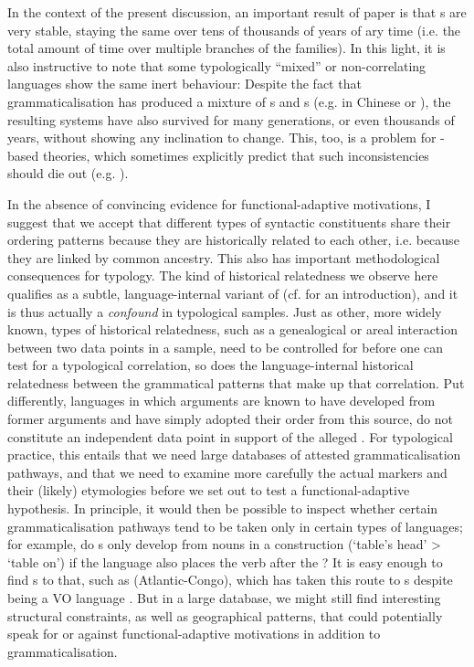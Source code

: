\documentclass[output=paper]{langsci/langscibook}
\begin{document}
  
In the context of the present discussion, an important result of  paper is that s are very stable, staying the same over tens of thousands of years of ary time (i.e. the total amount of time over multiple branches of the families). In this light, it is also instructive to note that some typologically “mixed” or non-correlating languages show the same inert behaviour: Despite the fact that grammaticalisation has produced a mixture of s and s (e.g. in Chinese or ), the resulting systems have also survived for many generations, or even thousands of years, without showing any inclination to change. This, too, is a problem for -based theories, which sometimes explicitly predict that such inconsistencies should die out (e.g. \citealt{KirbyHurford1997}).

In the absence of convincing evidence for functional-adaptive motivations, I suggest that we accept that different types of syntactic constituents share their ordering patterns because they are historically related to each other, i.e. because they are linked by common ancestry. This also has important methodological consequences for typology. The kind of historical relatedness we observe here \label{pg:collins:dependency}qualifies as a subtle, language-internal variant of  (cf. \citealt{Cysouw2011} for an introduction), and it is thus actually a \textit{confound} in typological samples. Just as other, more widely known, types of historical relatedness, such as a genealogical or areal interaction between two data points in a sample, need to be controlled for before one can test for a typological correlation, so does the language-internal historical relatedness between the grammatical patterns that make up that correlation. Put differently, languages in which  arguments are known to have developed from former  arguments and have simply adopted their order from this source, do not constitute an independent data point in support of the alleged . For typological practice, this entails that we need large databases
\label{pg:collins:refforhaspelmath}of attested grammaticalisation pathways, and that we need to examine more carefully the actual markers and their (likely) etymologies before we set out to test a functional-adaptive hypothesis. In principle, it would then be possible to inspect whether certain grammaticalisation pathways tend to be taken only in certain types of languages; for example, do s only develop from nouns in a  construction (‘table's head’ > ‘table on’) if the language also places the verb after the ? It is easy enough to find s to that, such as  (Atlantic-Congo), which has taken this route to s despite being a VO language \citep{Bodomo1997}. But in a large database, we might still find interesting structural constraints, as well as geographical patterns, that could potentially speak for or against functional-adaptive motivations in addition to grammaticalisation. 
\end{document}
